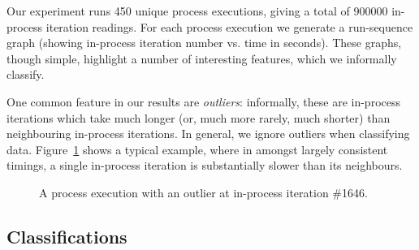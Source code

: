 \documentclass[a4paper,UKenglish]{lipics}
\begin{document}
Our experiment runs 450 unique process executions, giving a total of 900000
in-process iteration readings. For each process execution  we generate a
run-sequence graph (showing in-process iteration number vs. time in seconds).
These graphs, though simple, highlight a number of
interesting features, which we informally classify.

One common feature in our results are \emph{outliers}: informally, these are
in-process iterations which take much longer (or, much more rarely, much
shorter) than neighbouring in-process iterations. In general, we ignore outliers
when classifying data. Figure~\ref{fig:examples:outliers1}
shows a typical
example, where in amongst largely consistent timings, a single in-process
iteration is substantially slower than its neighbours.

\begin{figure}[tbp]
\caption{A process execution with an outlier at in-process iteration \#1646.}
\label{fig:examples:outliers1}
\end{figure}


\subsection{Classifications}
\end{document}
